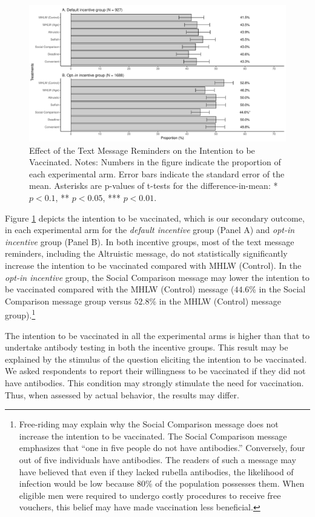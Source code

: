 \documentclass[
      12pt,
    a4paper
]{article}
\begin{document}
\begin{figure}[t]
\includegraphics{Main-Document-LaTeX_files/figure-latex/ttest-int-vacc-1} \caption{Effect of the Text Message Reminders on the Intention to be Vaccinated. Notes: Numbers in the figure indicate the proportion of each experimental arm. Error bars indicate the standard error of the mean. Asterisks are p-values of t-tests for the difference-in-mean: * $p < 0.1$, ** $p < 0.05$, *** $p < 0.01$.}\label{fig:ttest-int-vacc}
\end{figure}

Figure \ref{fig:ttest-int-vacc} depicts the intention to be vaccinated, which is our secondary outcome, in each experimental arm for the \emph{default incentive} group (Panel A) and \emph{opt-in incentive} group (Panel B). In both incentive groups, most of the text message reminders, including the Altruistic message, do not statistically significantly increase the intention to be vaccinated compared with MHLW (Control). In the \emph{opt-in incentive} group, the Social Comparison message may lower the intention to be vaccinated compared with the MHLW (Control) message (\(44.6\)\% in the Social Comparison message group versus \(52.8\)\% in the MHLW (Control) message group).\footnote{Free-riding may explain why the Social Comparison message does not increase the intention to be vaccinated. The Social Comparison message emphasizes that ``one in five people do not have antibodies.'' Conversely, four out of five individuals have antibodies. The readers of such a message may have believed that even if they lacked rubella antibodies, the likelihood of infection would be low because 80\% of the population possesses them. When eligible men were required to undergo costly procedures to receive free vouchers, this belief may have made vaccination less beneficial.}

The intention to be vaccinated in all the experimental arms is higher than that to undertake antibody testing in both the incentive groups. This result may be explained by the stimulus of the question eliciting the intention to be vaccinated. We asked respondents to report their willingness to be vaccinated if they did not have antibodies. This condition may strongly stimulate the need for vaccination. Thus, when assessed by actual behavior, the results may differ.
\end{document}
